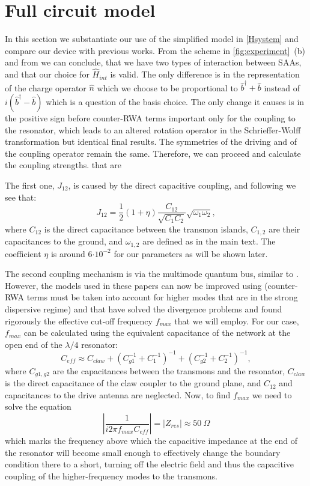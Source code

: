 \documentclass[%
 aps, prx,
 amsmath,amssymb,
 reprint,%
superscriptaddress
]{revtex4-2}
\begin{document}
\appendix

\section{Full circuit model}\label{sec:full_model}

In this section we substantiate our use of the simplified model in \autoref{Hsystem} and compare our device with previous works. From the scheme in \autoref{fig:experiment}~(b) and from \cite{yan2018tunable} we can conclude, that we have two types of interaction between SAAs, and that our choice for $\hat H_{int}$ is valid. The only difference is in the representation of the charge operator $\hat n$ which we choose to be proportional to $\hat b^\dag + \hat b$ instead of $i(\hat b^\dag - \hat b)$ which is a question of the basis choice. The only change it causes is in the positive sign before counter-RWA terms important only for the coupling to the resonator, which leads to an altered rotation operator in the Schrieffer-Wolff transformation but identical final results.  The symmetries of the driving and of the coupling operator remain the same. Therefore, we can proceed and calculate the coupling strengths. that are 

The first one, $J_{12}$, is caused by the direct capacitive coupling, and following \cite{yan2018tunable} we see that:
\[
J_{12} = \frac{1}{2}(1 + \eta)\frac{C_{12}}{\sqrt{C_1 C_2}} \sqrt{\omega_1 \omega_2},
\] 
where $C_{12}$ is the direct capacitance between the transmon islands, $C_{1,2}$ are their capacitances to the ground, and $\omega_{1,2}$ are defined as in the main text. The coefficient  $\eta$ is around 6$\cdot 10^{-2}$ for our parameters as will be shown later.


The second coupling mechanism is via the multimode quantum bus, similar to \cite{majer2007coupling, filipp2011multimode}. However, the models used in these papers can now be improved using \cite{yan2018tunable} (counter-RWA terms must be taken into account for higher modes that are in the strong dispersive regime) and \cite{malekakhlagh2017cutoff, gely2017convergence} that have solved the divergence problems and found rigorously the effective cut-off frequency $f_{max}$ that we will employ. For our case, $f_{max}$ can be calculated using the equivalent capacitance of the network at the open end of the $\lambda/4$ resonator:
\[
C_{eff} \approx C_{claw} + (C_{g1}^{-1} + C_{1}^{-1})^{-1} + (C_{g2}^{-1} + C_{2}^{-1})^{-1},
\] 
where $C_{g1, g2}$ are the capacitances between the transmons and the resonator, $C_{claw}$ is the direct capacitance of the claw coupler to the ground plane, and $C_{12}$ and capacitances to the drive antenna are neglected. Now, to find $f_{max}$ we need to solve the equation
\[
\left|\frac{1}{i 2\pi f_{max} C_{eff}}\right| = |Z_{res}| \approx 50\ \Omega
\]
which marks the frequency above which the capacitive impedance at the end of the resonator will become small enough to effectively change the boundary condition there to a short, turning off the electric field and thus the capacitive coupling of the higher-frequency modes to the transmons. 
\end{document}
